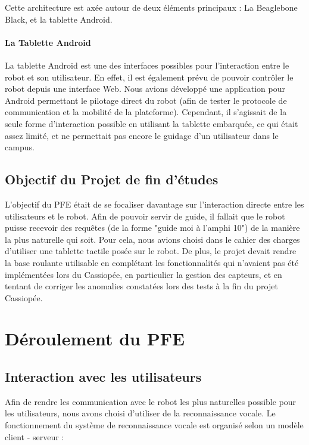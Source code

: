\documentclass{report}
\begin{document}
    {Cette architecture est axée autour de deux éléments principaux :
    La Beaglebone Black, et la tablette Android.}

    \subsubsection{La Tablette Android}

    {La tablette Android est une des interfaces possibles pour l'interaction entre le robot
    et son utilisateur. En effet, il est également prévu de pouvoir contrôler le robot
    depuis une interface Web. Nous avions développé une application pour Android
    permettant le pilotage direct du robot (afin de tester le protocole de communication
    et la mobilité de la plateforme). Cependant, il s'agissait de la seule forme d'interaction
    possible en utilisant la tablette embarquée, ce qui était assez limité, et ne permettait
     pas encore le guidage d'un utilisateur dans le campus.}


    \section{Objectif du Projet de fin d'études}

    {L'objectif du PFE était de se focaliser davantage sur l'interaction directe
     entre les utilisateurs et le robot. Afin de pouvoir servir de guide, il
     fallait que le robot puisse recevoir des requêtes (de la forme "guide
     moi à l'amphi 10") de la manière la plus naturelle qui soit. Pour cela,
     nous avions choisi dans le cahier des charges d'utiliser une tablette
     tactile posée sur le robot. De plus, le projet devait rendre la base
     roulante utilisable en complétant les fonctionnalités qui n'avaient pas
     été implémentées lors du Cassiopée, en particulier la gestion des capteurs,
     et en tentant de corriger les anomalies constatées lors des tests à la fin
     du projet Cassiopée.}



  \chapter{Déroulement du PFE}

    \section{Interaction avec les utilisateurs}

    {Afin de rendre les communication avec le robot les plus naturelles possible
    pour les utilisateurs, nous avons choisi d'utiliser de la reconnaissance vocale.
    Le fonctionnement du système de reconnaissance vocale est organisé selon
    un modèle client - serveur :}
\end{document}
